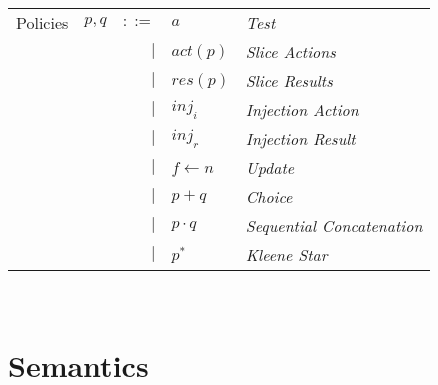 \documentclass[12pt, letterpaper]{article}
\begin{document}
    \begin{tabular}{l c r l l}
        Policies    & $p,q$ & $::=$  & $a$              & \textit{Test}     \\
                    &       & $\mid$ & $act(p)$         & \textit{Slice Actions}    \\
                    &       & $\mid$ & $res(p)$         & \textit{Slice Results}    \\
                    &       & $\mid$ & $inj_{i}$        & \textit{Injection Action} \\
                    &       & $\mid$ & $inj_{r}$        & \textit{Injection Result} \\
                    &       & $\mid$ & $f \leftarrow n$ & \textit{Update}   \\
                    &       & $\mid$ & $p + q$          & \textit{Choice}   \\
                    &       & $\mid$ & $p \cdot q$      & \textit{Sequential Concatenation} \\
                    &       & $\mid$ & $p ^{*}$         & \textit{Kleene Star}
    \end{tabular}\\
\section*{Semantics}
\end{document}
